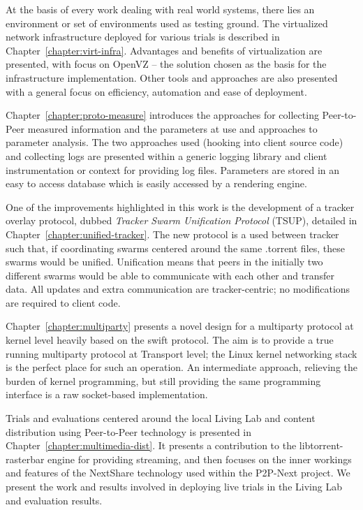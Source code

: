 At the basis of every work dealing with real world systems, there lies an
environment or set of environments used as testing ground. The virtualized
network infrastructure deployed for various trials is described in
Chapter~\ref{chapter:virt-infra}. Advantages and benefits of virtualization
are presented, with focus on OpenVZ -- the solution chosen as the basis for
the infrastructure implementation. Other tools and approaches are also
presented with a general focus on efficiency, automation and ease of
deployment.

Chapter~\ref{chapter:proto-measure} introduces the approaches for collecting
Peer-to-Peer measured information and the parameters at use and approaches to
parameter analysis. The two approaches used (hooking into client source code)
and collecting logs are presented within a generic logging library and client
instrumentation or context for providing log files. Parameters are stored in
an easy to access database which is easily accessed by a rendering engine.

One of the improvements highlighted in this work is the development of a
tracker overlay protocol, dubbed \textit{Tracker Swarm Unification Protocol}
(TSUP), detailed in Chapter~\ref{chapter:unified-tracker}. The new protocol is
a used between tracker such that, if coordinating swarms centered around the
same .torrent files, these swarms would be unified. Unification means that
peers in the initially two different swarms would be able to communicate with
each other and transfer data. All updates and extra communication are
tracker-centric; no modifications are required to client code.

Chapter~\ref{chapter:multiparty} presents a novel design for a multiparty
protocol at kernel level heavily based on the swift protocol. The aim is to
provide a true running multiparty protocol at Transport level; the Linux
kernel networking stack is the perfect place for such an operation. An
intermediate approach, relieving the burden of kernel programming, but still
providing the same programming interface is a raw socket-based implementation.

Trials and evaluations centered around the local Living Lab and content
distribution using Peer-to-Peer technology is presented in
Chapter~\ref{chapter:multimedia-dist}. It presents a contribution to the
libtorrent-rasterbar engine for providing streaming, and then focuses on the
inner workings and features of the NextShare technology used within the
P2P-Next project. We present the work and results involved in deploying live
trials in the Living Lab and evaluation results.

